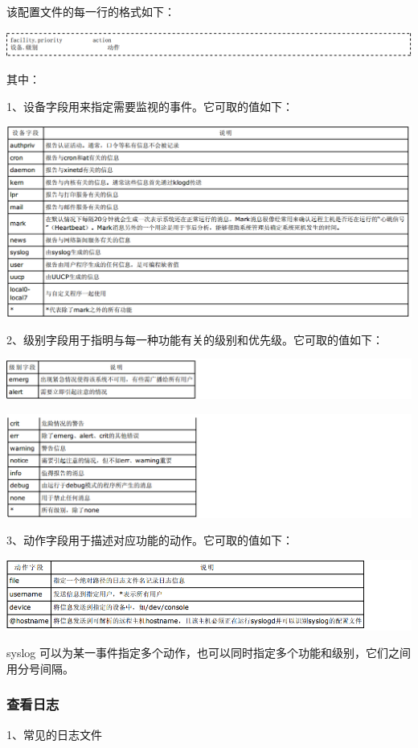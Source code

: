 \documentclass[letterpaper,10pt]{sphinxmanual}
\begin{document}
该配置文件的每一行的格式如下：

\includegraphics{format.png}

其中：

1、设备字段用来指定需要监视的事件。它可取的值如下：

\includegraphics{faility.png}

2、级别字段用于指明与每一种功能有关的级别和优先级。它可取的值如下：

\includegraphics{prio1.png}

\includegraphics{prio2.png}

3、动作字段用于描述对应功能的动作。它可取的值如下：

\includegraphics{action1.png}

syslog 可以为某一事件指定多个动作，也可以同时指定多个功能和级别，它们之间用分号间隔。


\subsubsection{查看日志}
\label{Linux_log/syslog:id2}
1、常见的日志文件
\end{document}
